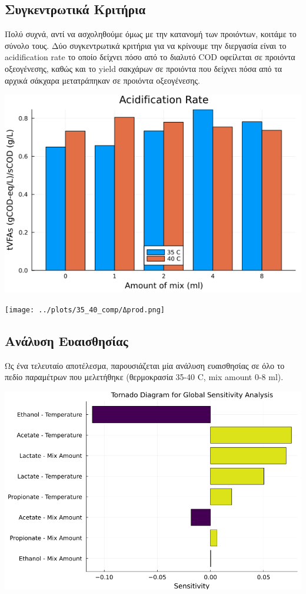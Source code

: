 \documentclass[11pt]{article}
\begin{document}
\subsection{Συγκεντρωτικά Κριτήρια}
\label{sec:org662a4b8}
Πολύ συχνά, αντί να ασχοληθούμε όμως με την κατανομή των προιόντων, κοιτάμε το σύνολο τους. Δύο συγκεντρωτικά κριτήρια για να κρίνουμε την διεργασία είναι το acidification rate το οποίο δείχνει πόσο από το διαλυτό COD οφείλεται σε προιόντα οξεογένεσης, καθώς και το yield σακχάρων σε προιόντα που δείχνει πόσα από τα αρχικά σάκχαρα μετατράπηκαν σε προιόντα οξεογένεσης.

\begin{center}
\includegraphics[width=.9\linewidth]{../plots/35_40_comp/acidification_comp.png}
\end{center}

\begin{center}
\texttt{[image: ../plots/35\_40\_comp/Δprod.png]}
\end{center}

\subsection{Ανάλυση Ευαισθησίας}
\label{sec:org2afb86a}
Ως ένα τελευταίο αποτέλεσμα, παρουσιάζεται μία ανάλυση ευαισθησίας σε όλο το πεδίο παραμέτρων που μελετήθηκε (θερμοκρασία 35-40 C, mix amount 0-8 ml).
\begin{center}
\includegraphics[width=.9\linewidth]{../plots/sensitivity/global_tornado.png}
\end{center}
\end{document}
